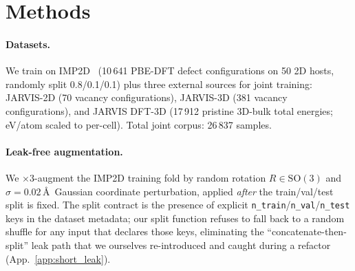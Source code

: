 \documentclass[11pt,a4paper]{article}
\begin{document}
\section{Methods}\label{sec:methods}

\paragraph{Datasets.}
We train on IMP2D~\cite{Bertoldo2022QPOD} (10\,641 PBE-DFT defect
configurations on 50 2D hosts, randomly split 0.8/0.1/0.1) plus
three external sources for joint training: JARVIS-2D (70 vacancy
configurations), JARVIS-3D (381 vacancy configurations), and
JARVIS DFT-3D (17\,912 pristine 3D-bulk total energies; eV/atom
scaled to per-cell). Total joint corpus: 26\,837 samples.

\paragraph{Leak-free augmentation.}
We $\times3$-augment the IMP2D training fold by random rotation
$R\in\mathrm{SO}(3)$ and $\sigma=0.02$\,\AA\ Gaussian coordinate
perturbation, applied \emph{after} the train/val/test split is
fixed. The split contract is the presence of explicit
\texttt{n\_train}/\texttt{n\_val}/\texttt{n\_test} keys in the
dataset metadata; our split function refuses to fall back to a
random shuffle for any input that declares those keys, eliminating
the ``concatenate-then-split'' leak path that we ourselves
re-introduced and caught during a refactor (App.~\ref{app:short_leak}).
\end{document}
